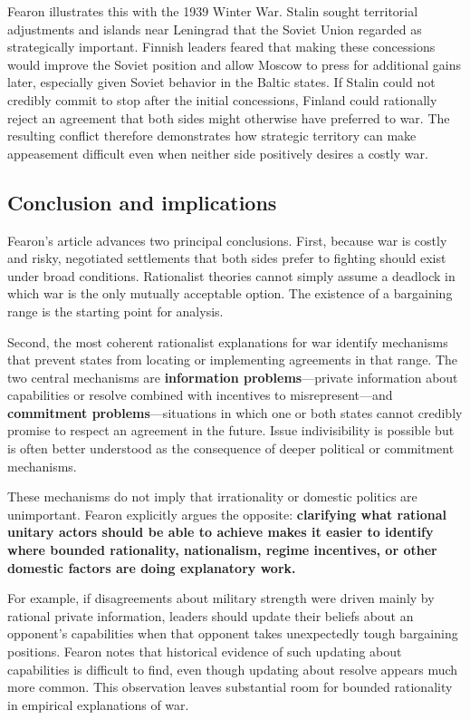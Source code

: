 Fearon illustrates this with the 1939 Winter War. Stalin sought territorial adjustments and islands near Leningrad that the Soviet Union regarded as strategically important. Finnish leaders feared that making these concessions would improve the Soviet position and allow Moscow to press for additional gains later, especially given Soviet behavior in the Baltic states. If Stalin could not credibly commit to stop after the initial concessions, Finland could rationally reject an agreement that both sides might otherwise have preferred to war. The resulting conflict therefore demonstrates how strategic territory can make appeasement difficult even when neither side positively desires a costly war.

\subsection{Conclusion and implications}

Fearon's article advances two principal conclusions. First, because war is costly and risky, negotiated settlements that both sides prefer to fighting should exist under broad conditions. Rationalist theories cannot simply assume a deadlock in which war is the only mutually acceptable option. The existence of a bargaining range is the starting point for analysis.

Second, the most coherent rationalist explanations for war identify mechanisms that prevent states from locating or implementing agreements in that range. The two central mechanisms are \textbf{information problems}---private information about capabilities or resolve combined with incentives to misrepresent---and \textbf{commitment problems}---situations in which one or both states cannot credibly promise to respect an agreement in the future. Issue indivisibility is possible but is often better understood as the consequence of deeper political or commitment mechanisms.

These mechanisms do not imply that irrationality or domestic politics are unimportant. Fearon explicitly argues the opposite: \textbf{clarifying what rational unitary actors should be able to achieve makes it easier to identify where bounded rationality, nationalism, regime incentives, or other domestic factors are doing explanatory work.}

For example, if disagreements about military strength were driven mainly by rational private information, leaders should update their beliefs about an opponent's capabilities when that opponent takes unexpectedly tough bargaining positions. Fearon notes that historical evidence of such updating about capabilities is difficult to find, even though updating about resolve appears much more common. This observation leaves substantial room for bounded rationality in empirical explanations of war.

